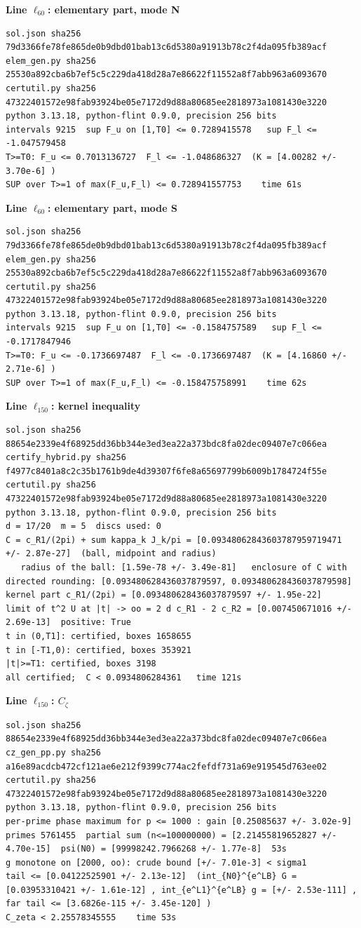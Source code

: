 \documentclass[11pt,reqno]{amsart}
\numberwithin{equation}{section}
\theoremstyle{definition}
\theoremstyle{remark}
\newcommand{\appsub}[1]{\par\medskip\noindent\textbf{#1}\par\nobreak\smallskip}
\begin{document}
\appsub{Line $\ell_{60}$: elementary part, mode N}
\begin{lstlisting}
sol.json sha256 79d3366fe78fe865de0b9dbd01bab13c6d5380a91913b78c2f4da095fb389acf
elem_gen.py sha256 25530a892cba6b7ef5c5c229da418d28a7e86622f11552a8f7abb963a6093670
certutil.py sha256 47322401572e98fab93924be05e7172d9d88a80685ee2818973a1081430e3220
python 3.13.18, python-flint 0.9.0, precision 256 bits
intervals 9215  sup F_u on [1,T0] <= 0.7289415578   sup F_l <= -1.047579458
T>=T0: F_u <= 0.7013136727  F_l <= -1.048686327  (K = [4.00282 +/- 3.70e-6] )
SUP over T>=1 of max(F_u,F_l) <= 0.728941557753    time 61s
\end{lstlisting}
\appsub{Line $\ell_{60}$: elementary part, mode S}
\begin{lstlisting}
sol.json sha256 79d3366fe78fe865de0b9dbd01bab13c6d5380a91913b78c2f4da095fb389acf
elem_gen.py sha256 25530a892cba6b7ef5c5c229da418d28a7e86622f11552a8f7abb963a6093670
certutil.py sha256 47322401572e98fab93924be05e7172d9d88a80685ee2818973a1081430e3220
python 3.13.18, python-flint 0.9.0, precision 256 bits
intervals 9215  sup F_u on [1,T0] <= -0.1584757589   sup F_l <= -0.1717847946
T>=T0: F_u <= -0.1736697487  F_l <= -0.1736697487  (K = [4.16860 +/- 2.71e-6] )
SUP over T>=1 of max(F_u,F_l) <= -0.158475758991    time 62s
\end{lstlisting}
\appsub{Line $\ell_{150}$: kernel inequality}
\begin{lstlisting}
sol.json sha256 88654e2339e4f68925dd36bb344e3ed3ea22a373bdc8fa02dec09407e7c066ea
certify_hybrid.py sha256 f4977c8401a8c2c35b1761b9de4d39307f6fe8a65697799b6009b1784724f55e
certutil.py sha256 47322401572e98fab93924be05e7172d9d88a80685ee2818973a1081430e3220
python 3.13.18, python-flint 0.9.0, precision 256 bits
d = 17/20  m = 5  discs used: 0 
C = c_R1/(2pi) + sum kappa_k J_k/pi = [0.09348062843603787959719471 +/- 2.87e-27]  (ball, midpoint and radius)
   radius of the ball: [1.59e-78 +/- 3.49e-81]   enclosure of C with directed rounding: [0.093480628436037879597, 0.093480628436037879598]
kernel part c_R1/(2pi) = [0.093480628436037879597 +/- 1.95e-22]
limit of t^2 U at |t| -> oo = 2 d c_R1 - 2 c_R2 = [0.007450671016 +/- 2.69e-13]  positive: True
t in (0,T1]: certified, boxes 1658655
t in [-T1,0): certified, boxes 353921
|t|>=T1: certified, boxes 3198
all certified;  C < 0.0934806284361   time 121s
\end{lstlisting}
\appsub{Line $\ell_{150}$: $C_\zeta$}
\begin{lstlisting}
sol.json sha256 88654e2339e4f68925dd36bb344e3ed3ea22a373bdc8fa02dec09407e7c066ea
cz_gen_pp.py sha256 a16e89acdcb472cf121ae6e212f9399c774ac2fefdf731a69e919545d763ee02
certutil.py sha256 47322401572e98fab93924be05e7172d9d88a80685ee2818973a1081430e3220
python 3.13.18, python-flint 0.9.0, precision 256 bits
per-prime phase maximum for p <= 1000 : gain [0.25085637 +/- 3.02e-9]
primes 5761455  partial sum (n<=100000000) = [2.21455819652827 +/- 4.70e-15]  psi(N0) = [99998242.7966268 +/- 1.77e-8]  53s
g monotone on [2000, oo): crude bound [+/- 7.01e-3] < sigma1
tail <= [0.04122525901 +/- 2.13e-12]  (int_{N0}^{e^LB} G = [0.03953310421 +/- 1.61e-12] , int_{e^L1}^{e^LB} g = [+/- 2.53e-111] , far tail <= [3.6826e-115 +/- 3.45e-120] )
C_zeta < 2.25578345555    time 53s
\end{lstlisting}
\end{document}
